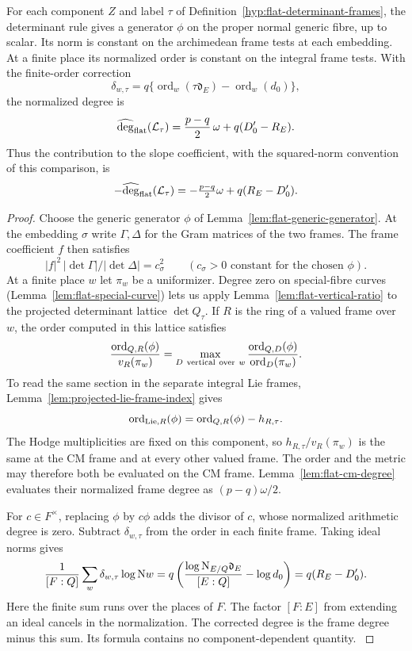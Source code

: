 \begin{proposition}
\label{prop:deep-flat-line-degree}
For each component \(Z\) and label \(\tau\) of
Definition~\ref{hyp:flat-determinant-frames}, the determinant rule gives a
generator \(\phi\) on the proper normal generic fibre, up to scalar.
Its norm is constant on the archimedean frame tests at each embedding. At a finite place its normalized order is constant on the integral
frame tests. With the finite-order correction
\[
 \delta_{w,\tau}=q\{\operatorname{ord}_w(\tau\mathfrak d_E)
                              -\operatorname{ord}_w(d_0)\},
\]
the normalized degree is
\[
 \widehat{\deg}_{\rm flat}(\mathcal L_\tau)
       =\frac{p-q}{2}\,\omega+q(D_0'-R_E).
\]
Thus the contribution to the slope coefficient, with the squared-norm convention of this comparison, is
\[
 -\widehat{\deg}_{\rm flat}(\mathcal L_\tau)=-\tfrac{p-q}{2}\omega+q(R_E-D'_0).
\]

\end{proposition}

\begin{proof}
Choose the generic generator \(\phi\) of
Lemma~\ref{lem:flat-generic-generator}. At the embedding \(\sigma\)
write \(\Gamma,\Delta\) for the Gram matrices of the two frames.
The frame coefficient \(f\) then satisfies
\[
 |f|^2\,|\det\Gamma|/|\det\Delta|=c_\sigma^2
 \qquad(c_\sigma>0\text{ constant for the chosen }\phi).
\]
At a finite place \(w\) let \(\pi_w\) be a uniformizer. Degree zero on special-fibre curves
(Lemma~\ref{lem:flat-special-curve}) lets us apply
Lemma~\ref{lem:flat-vertical-ratio} to the projected determinant
lattice \(\det Q_\tau\). If \(R\) is the ring of a valued frame
over \(w\), the order computed in this lattice satisfies
\[
 \frac{\operatorname{ord}_{Q,R}(\phi)}{v_R(\pi_w)}
    =\max_{D\ {\rm vertical\ over}\ w}
       \frac{\operatorname{ord}_{Q,D}(\phi)}
            {\operatorname{ord}_D(\pi_w)} .
\]
To read the same section in the separate integral Lie frames,
Lemma~\ref{lem:projected-lie-frame-index} gives
\[
   \operatorname{ord}_{{\rm Lie},R}(\phi)
       =\operatorname{ord}_{Q,R}(\phi)-h_{R,\tau}.
\]
The Hodge multiplicities are fixed on this component, so
\(h_{R,\tau}/v_R(\pi_w)\) is the same at the CM frame and
at every other valued frame. The order and the metric may therefore
both be evaluated on the CM frame.
Lemma~\ref{lem:flat-cm-degree} evaluates their normalized frame
degree as \((p-q)\omega/2\).

For \(c\in F^\times\), replacing \(\phi\) by \(c\phi\) adds the
divisor of \(c\), whose normalized arithmetic degree is zero. Subtract
\(\delta_{w,\tau}\) from the order in each finite frame. Taking ideal
norms gives
\[
 \frac{1}{[F:\mathbb Q]}\sum_w\delta_{w,\tau}\log{\rm N}w
 =q\left(
 \frac{\log{\rm N}_{E/\mathbb Q}\mathfrak d_E}{[E:\mathbb Q]}
 -\log d_0\right)=q(R_E-D_0').
\]
Here the finite sum runs over the places of \(F\). The factor
\([F:E]\) from extending an ideal cancels in the normalization.
The corrected degree is the frame degree minus this sum. Its formula
contains no component-dependent quantity.
\label{cor:deep-cover-flat-degree-1}
\end{proof}

